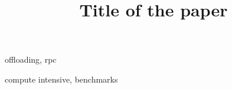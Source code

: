 \documentclass[preprint,!times]{sigplanconf}
\newcommand{\ignore}[1]{}
\begin{document}
\copyrightdata{[to be supplied]} 

\preprintfooter{}   %

\title{Title of the paper}

\authorinfo{}
\ignore{
\authorinfo{Pranith Kumar \and Second Author}
           {Georgia Institute of Technology}
           {\{pranith, second.author\}@gatech.edu}
}

\maketitle




\terms
offloading, rpc 

\keywords
compute intensive, benchmarks



%














%


\end{document}
